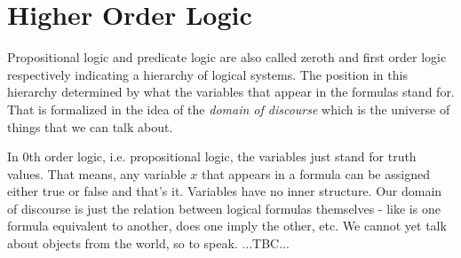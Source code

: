 




\section{Higher Order Logic}
Propositional logic and predicate logic are also called zeroth and first order logic respectively indicating a hierarchy of logical systems. The position in this hierarchy determined by what the variables that appear in the formulas stand for. That is formalized in the idea of the \emph{domain of discourse} which is the universe of things that we can talk about.

\medskip
In 0th order logic, i.e. propositional logic, the variables just stand for truth values. That means, any variable $x$ that appears in a formula can be assigned either true or false and that's it. Variables have no inner structure. Our domain of discourse is just the relation between logical formulas themselves - like is one formula equivalent to another, does one imply the other, etc. We cannot yet talk about objects from the world, so to speak. ...TBC...

